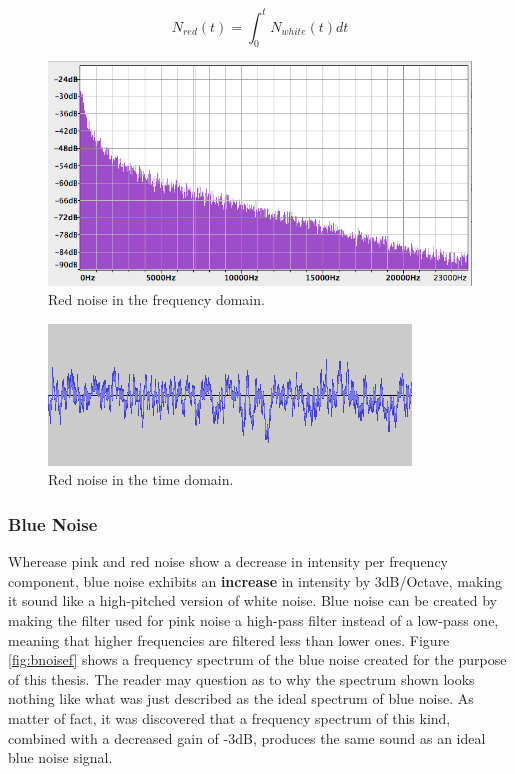 \begin{equation}
  N_{red}(t) = \int_{0}^{t} N_{white}(t)dt
  \label{eq:rnoise}
\end{equation}

\begin{figure}[t!]
  \includegraphics[scale=0.6]{img/rnoisef}
  \caption{Red noise in the frequency domain.}
  \label{fig:rnoisef}
\end{figure}

\begin{figure}[t!]
  \includegraphics[scale=0.7]{img/rnoiset}
  \caption{Red noise in the time domain.}
  \label{fig:rnoiset}
\end{figure}

\pagebreak

\subsubsection{Blue Noise}

Wherease pink and red noise show a decrease in intensity per frequency component, blue noise exhibits an \textbf{increase} in intensity by 3dB/Octave, making it sound like a high-pitched version of white noise. Blue noise can be created by making the filter used for pink noise a high-pass filter instead of a low-pass one, meaning that higher frequencies are filtered less than lower ones. Figure \ref{fig:bnoisef} shows a frequency spectrum of the blue noise created for the purpose of this thesis. The reader may question as to why the spectrum shown looks nothing like what was just described as the ideal spectrum of blue noise. As matter of fact, it was discovered that a frequency spectrum of this kind, combined with a decreased gain of -3dB, produces the same sound as an ideal blue noise signal.

